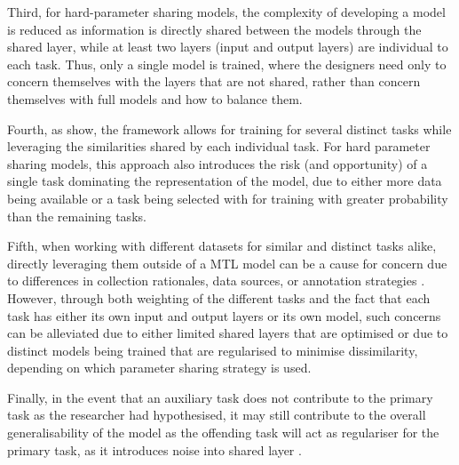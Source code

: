 Third, for hard-parameter sharing models, the complexity of developing a model is reduced as information is directly shared between the models through the shared layer, while at least two layers (input and output layers) are individual to each task.
Thus, only a single model is trained, where the designers need only to concern themselves with the layers that are not shared, rather than concern themselves with full models and how to balance them.

Fourth, as \cite{Caruana:1997} show, the framework allows for training for several distinct tasks while leveraging the similarities shared by each individual task.
For hard parameter sharing models, this approach also introduces the risk (and opportunity) of a single task dominating the representation of the model, due to either more data being available or a task being selected with for training with greater probability than the remaining tasks.

Fifth, when working with different datasets for similar and distinct tasks alike, directly leveraging them outside of a MTL model can be a cause for concern due to differences in collection rationales, data sources, or annotation strategies \cite{Waseem:2018}. 
However, through both weighting of the different tasks and the fact that each task has either its own input and output layers or its own model, such concerns can be alleviated due to either limited shared layers that are optimised or due to distinct models being trained that are regularised to minimise dissimilarity, depending on which parameter sharing strategy is used.

Finally, in the event that an auxiliary task does not contribute to the primary task as the researcher had hypothesised, it may still contribute to the overall generalisability of the model as the offending task will act as regulariser for the primary task, as it introduces noise into shared layer \citep{Bingel:2018}.


